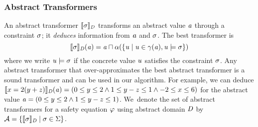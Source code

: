 \subsubsection{Abstract Transformers}
%
%
An abstract transformer $\llbracket \sigma \rrbracket_{\mathit{D}}$ transforms an
abstract value $\mathit{a}$ through a constraint $\sigma$; it
\emph{deduces} information from $\mathit{a}$ and $\sigma$.  The best
transformer is
%
\begin{equation}\label{eq:abstrans}
\llbracket \sigma \rrbracket_{\mathit{D}}(\mathit{a})=\mathit{a}\sqcap\alpha(\{\mathit{u}\mid \mathit{u}\in\gamma(\mathit{a}), \mathit{u}\models \sigma\})
\end{equation}
 where we write 
$\mathit{u}\models \sigma$ if the concrete value $\mathit{u}$ satisfies the constraint $\sigma$.
Any abstract transformer that over-approximates the best abstract
transformer is a sound transformer and can be used in our algorithm.
%
For example, we can deduce $\llbracket x=2(y+z) \rrbracket_{\mathit{D}}(\mathit{a})=(0\leq y
\leq 2 \wedge\allowbreak 1 \leq y-z \leq 1\wedge\allowbreak -2\leq x\leq 6)$
for the abstract value $\mathit{a}=(0\leq y \leq 2 \wedge\allowbreak 1 \leq y-z
\leq 1)$.
%
We~denote the set of abstract transformers for a safety equation
$\varphi$ using abstract domain $\mathit{D}$ by
$\mathcal{A}=\{\llbracket \sigma \rrbracket_{\mathit{D}}\mid
\sigma\in\Sigma\}$.

